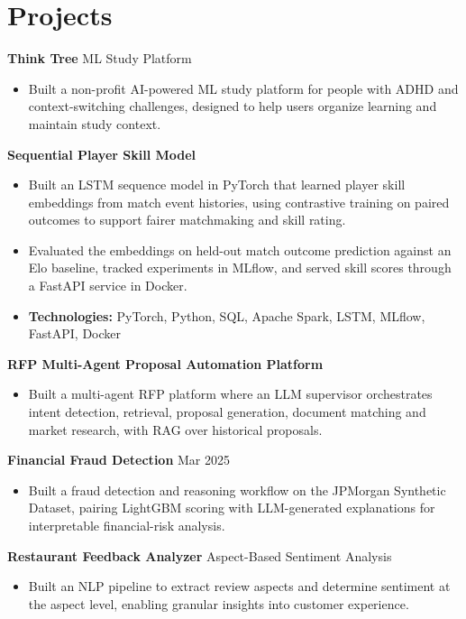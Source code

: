 \documentclass[10pt,a4paper]{article}
\begin{document}
\section{Projects}
\textbf{Think Tree} \textbar{} ML Study Platform\par
\begin{itemize}
  \item Built a non-profit AI-powered ML study platform for people with ADHD and context-switching challenges, designed to help users organize learning and maintain study context.
\end{itemize}
\textbf{Sequential Player Skill Model}\par
\begin{itemize}
  \item Built an LSTM sequence model in PyTorch that learned player skill embeddings from match event histories, using contrastive training on paired outcomes to support fairer matchmaking and skill rating.
  \item Evaluated the embeddings on held-out match outcome prediction against an Elo baseline, tracked experiments in MLflow, and served skill scores through a FastAPI service in Docker.
  \item \textbf{Technologies:} PyTorch, Python, SQL, Apache Spark, LSTM, MLflow, FastAPI, Docker
\end{itemize}
\textbf{RFP Multi-Agent Proposal Automation Platform}\par
\begin{itemize}
  \item Built a multi-agent RFP platform where an LLM supervisor orchestrates intent detection, retrieval, proposal generation, document matching and market research, with RAG over historical proposals.
\end{itemize}
\textbf{Financial Fraud Detection} \textbar{} Mar 2025\par
\begin{itemize}
  \item Built a fraud detection and reasoning workflow on the JPMorgan Synthetic Dataset, pairing LightGBM scoring with LLM-generated explanations for interpretable financial-risk analysis.
\end{itemize}
\textbf{Restaurant Feedback Analyzer} \textbar{} Aspect-Based Sentiment Analysis\par
\begin{itemize}
  \item Built an NLP pipeline to extract review aspects and determine sentiment at the aspect level, enabling granular insights into customer experience.
\end{itemize}
\end{document}
